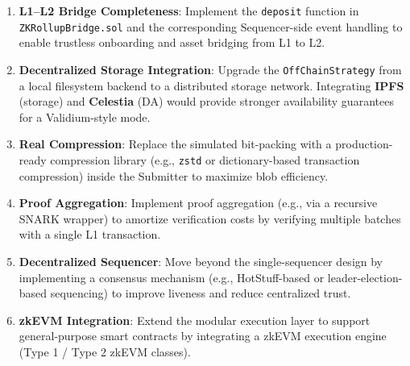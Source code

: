 \begin{enumerate}
    \item \textbf{L1--L2 Bridge Completeness}: Implement the \texttt{deposit} function in \texttt{ZKRollupBridge.sol} and the corresponding Sequencer-side event handling to enable trustless onboarding and asset bridging from L1 to L2.
    \item \textbf{Decentralized Storage Integration}: Upgrade the \texttt{OffChainStrategy} from a local filesystem backend to a distributed storage network. Integrating \textbf{IPFS} (storage) and \textbf{Celestia} (DA) would provide stronger availability guarantees for a Validium-style mode.
    \item \textbf{Real Compression}: Replace the simulated bit-packing with a production-ready compression library (e.g., \texttt{zstd} or dictionary-based transaction compression) inside the Submitter to maximize blob efficiency.
    \item \textbf{Proof Aggregation}: Implement proof aggregation (e.g., via a recursive SNARK wrapper) to amortize verification costs by verifying multiple batches with a single L1 transaction.
    \item \textbf{Decentralized Sequencer}: Move beyond the single-sequencer design by implementing a consensus mechanism (e.g., HotStuff-based or leader-election-based sequencing) to improve liveness and reduce centralized trust.
    \item \textbf{zkEVM Integration}: Extend the modular execution layer to support general-purpose smart contracts by integrating a zkEVM execution engine (Type 1 / Type 2 zkEVM classes).
\end{enumerate}

